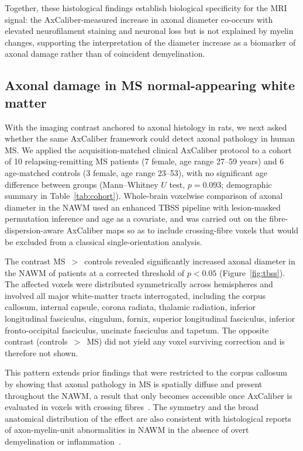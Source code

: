 \documentclass[11pt]{article}
\begin{document}
Together, these histological findings establish biological specificity for the MRI signal: the AxCaliber-measured increase in axonal diameter co-occurs with elevated neurofilament staining and neuronal loss but is not explained by myelin changes, supporting the interpretation of the diameter increase as a biomarker of axonal damage rather than of coincident demyelination.

\subsection{Axonal damage in MS normal-appearing white matter}

With the imaging contrast anchored to axonal histology in rats, we next asked whether the same AxCaliber framework could detect axonal pathology in human MS. We applied the acquisition-matched clinical AxCaliber protocol to a cohort of 10 relapsing-remitting MS patients (7 female, age range 27--59 years) and 6 age-matched controls (3 female, age range 23--53), with no significant age difference between groups (Mann--Whitney $U$ test, $p=0.093$; demographic summary in Table~\ref{tab:cohort}). Whole-brain voxelwise comparison of axonal diameter in the NAWM used an enhanced TBSS pipeline with lesion-masked permutation inference and age as a covariate, and was carried out on the fibre-dispersion-aware AxCaliber maps so as to include crossing-fibre voxels that would be excluded from a classical single-orientation analysis.

The contrast MS~$>$~controls revealed significantly increased axonal diameter in the NAWM of patients at a corrected threshold of $p<0.05$ (Figure~\ref{fig:tbss}). The affected voxels were distributed symmetrically across hemispheres and involved all major white-matter tracts interrogated, including the corpus callosum, internal capsule, corona radiata, thalamic radiation, inferior longitudinal fasciculus, cingulum, fornix, superior longitudinal fasciculus, inferior fronto-occipital fasciculus, uncinate fasciculus and tapetum. The opposite contrast (controls~$>$~MS) did not yield any voxel surviving correction and is therefore not shown.

This pattern extends prior findings that were restricted to the corpus callosum~\cite{desantis2019whole} by showing that axonal pathology in MS is spatially diffuse and present throughout the NAWM, a result that only becomes accessible once AxCaliber is evaluated in voxels with crossing fibres~\cite{jeurissen2013investigating}. The symmetry and the broad anatomical distribution of the effect are also consistent with histological reports of axon-myelin-unit abnormalities in NAWM in the absence of overt demyelination or inflammation~\cite{luchicchi2021axonal}.
\end{document}
